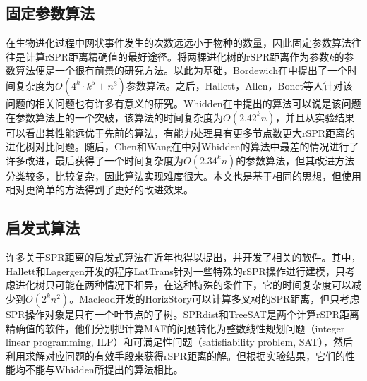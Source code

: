 \subsection{固定参数算法}
在生物进化过程中网状事件发生的次数远远小于物种的数量，因此固定参数算法往往是计算rSPR距离精确值的最好途径。将两棵进化树的rSPR距离作为参数$k$的参数算法便是一个很有前景的研究方法。以此为基础，Bordewich在\cite{bordewich20083}中提出了一个时间复杂度为$O(4^k \cdot k^5 + n^3)$参数算法。之后，Hallett，Allen，Bonet等人针对该问题的相关问题也有许多有意义的研究。Whidden在\cite{whidden2010fast}中提出的算法可以说是该问题在参数算法上的一个突破，该算法的时间复杂度为$O(2.42^kn)$，并且从实验结果可以看出其性能远优于先前的算法，有能力处理具有更多节点数更大rSPR距离的进化树对比问题。随后，Chen和Wang在\cite{chen2012faster}中对Whidden的算法中最差的情况进行了许多改进，最后获得了一个时间复杂度为$O(2.34^kn)$的参数算法，但其改进方法分类较多，比较复杂，因此算法实现难度很大。本文也是基于相同的思想，但使用相对更简单的方法得到了更好的改进效果。

\subsection{启发式算法}
许多关于SPR距离的启发式算法在近年也得以提出，并开发了相关的软件。其中，Hallett和Lagergen开发的程序LatTrans针对一些特殊的rSPR操作进行建模，只考虑进化树只可能在两种情况下相异，在这种特殊的条件下，它的时间复杂度可以减少到$O(2^kn^2)$。Macleod开发的HorizStory可以计算多叉树的SPR距离，但只考虑SPR操作对象是只有一个叶节点的子树。SPRdist和TreeSAT是两个计算rSPR距离精确值的软件，他们分别把计算MAF的问题转化为整数线性规划问题（integer linear programming, ILP）和可满足性问题（satisfiability problem, SAT），然后利用求解对应问题的有效手段来获得rSPR距离的解。但根据实验结果，它们的性能均不能与Whidden所提出的算法相比。






































